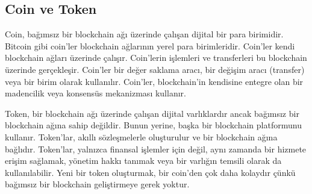 \subsection{Coin ve Token}

Coin, bağımsız bir blockchain ağı üzerinde çalışan dijital bir para birimidir. Bitcoin gibi coin'ler blockchain ağlarının yerel para birimleridir. Coin'ler kendi blockchain ağları üzerinde çalışır. Coin'lerin işlemleri ve transferleri bu blockchain üzerinde gerçekleşir. Coin'ler bir değer saklama aracı, bir değişim aracı (transfer) veya bir birim olarak kullanılır. Coin'ler, blockchain'in kendisine entegre olan bir madencilik veya konsensüs mekanizması kullanır.

Token, bir blockchain ağı üzerinde çalışan dijital varlıklardır ancak bağımsız bir blockchain ağına sahip değildir. Bunun yerine, başka bir blockchain platformunu kullanır. Token'lar, akıllı sözleşmelerle oluşturulur ve bir blockchain ağına bağlıdır. Token'lar, yalnızca finansal işlemler için değil, aynı zamanda bir hizmete erişim sağlamak, yönetim hakkı tanımak veya bir varlığın temsili olarak da kullanılabilir. Yeni bir token oluşturmak, bir coin'den çok daha kolaydır çünkü bağımsız bir blockchain geliştirmeye gerek yoktur.

\newpage